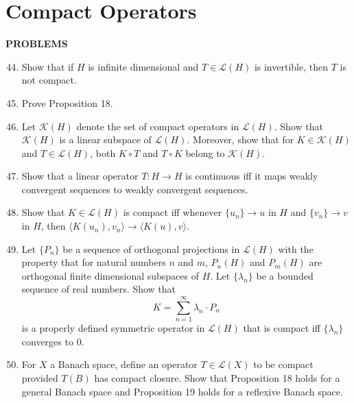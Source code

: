 \section{Compact Operators}
\begin{center}
	\textbf{PROBLEMS}
\end{center}
\begin{enumerate}
	\setcounter{enumi}{43}
    \item Show that if $H$ is infinite dimensional and $T\in\mathcal{L}(H)$ is invertible, then $T$ is not compact.
    \item Prove Proposition 18.
    \item Let $\mathcal{K}(H)$ denote the set of compact operators in $\mathcal{L}(H)$.
    Show that $\mathcal{K}(H)$ is a linear subspace of $\mathcal{L}(H)$.
    Moreover, show that for $K\in\mathcal{K}(H)$ and $T\in\mathcal{L}(H)$, both $K\circ T$ and $T\circ K$ belong to $\mathcal{K}(H)$.
    \item Show that a linear operator $T:H\to H$ is continuous iff it maps weakly convergent sequences to weakly convergent sequences.
    \item Show that $K\in\mathcal{L}(H)$ is compact iff whenever $\{u_n\}\to u$ in $H$ and $\{v_n\}\to v$ in $H$, then $\langle K(u_n),v_n\rangle\to\langle K(u),v\rangle$.
    \item Let $\{P_n\}$ be a sequence of orthogonal projections in $\mathcal{L}(H)$ with the property that for natural numbers $n$ and $m$, $P_n(H)$ and $P_m(H)$ are orthogonal finite dimensional subspaces of $H$.
    Let $\{\lambda_n\}$ be a bounded sequence of real numbers.
    Show that 
    \[
        K=\sum_{n=1}^\infty\lambda_n\cdot P_n
    \]
    is a properly defined symmetric operator in $\mathcal{L}(H)$ that is compact iff $\{\lambda_n\}$ converges to $0$.
    \item For $X$ a Banach space, define an operator $T\in\mathcal{L}(X)$ to be compact provided $T(B)$ has compact closure.
    Show that Proposition 18 holds for a general Banach space and Proposition 19 holds for a reflexive Banach space.
\end{enumerate}

